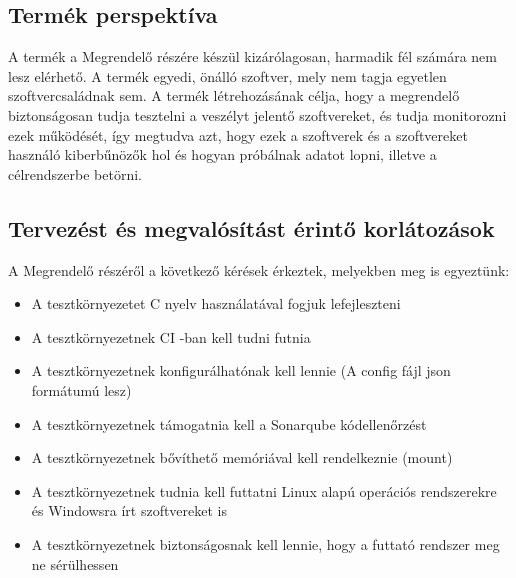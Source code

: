\documentclass{scrreprt}
\begin{document}
\subsection{Termék perspektíva}
A termék a Megrendelő részére készül kizárólagosan, harmadik fél számára nem lesz elérhető. A termék egyedi, önálló szoftver, mely nem tagja egyetlen
szoftvercsaládnak sem. A termék létrehozásának célja, hogy a megrendelő biztonságosan tudja tesztelni a veszélyt jelentő szoftvereket, és tudja monitorozni
ezek működését, így megtudva azt, hogy ezek a szoftverek és a szoftvereket használó kiberbűnözők hol és hogyan próbálnak adatot lopni, illetve a célrendszerbe
betörni.

\subsection{Tervezést és megvalósítást érintő korlátozások}
A Megrendelő részéről a következő kérések érkeztek, melyekben meg is egyeztünk:
\begin{itemize}
      \item A tesztkörnyezetet C nyelv használatával fogjuk lefejleszteni
      \item A tesztkörnyezetnek CI -ban kell tudni futnia
      \item A tesztkörnyezetnek konfigurálhatónak kell lennie (A config fájl json formátumú lesz)
      \item A tesztkörnyezetnek támogatnia kell a Sonarqube kódellenőrzést
      \item A tesztkörnyezetnek bővíthető memóriával kell rendelkeznie (mount)
      \item A tesztkörnyezetnek tudnia kell futtatni Linux alapú operációs rendszerekre és Windowsra írt szoftvereket is
      \item A tesztkörnyezetnek biztonságosnak kell lennie, hogy a futtató rendszer meg ne sérülhessen
\end{itemize}
\end{document}
